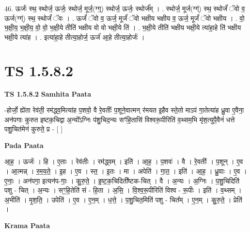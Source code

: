\documentclass[17pt]{extarticle}
\begin{document}
46. ऊर्जः॑ स्थ॒ स्थोर्ज॒ ऊर्जः॒ स्थोर्ज॒ मूर्ज॒(ग्ग्॒) स्थोर्ज॒ ऊर्जः॒ स्थोर्ज᳚म् । . स्थोर्ज॒ मूर्ज(ग्ग्॑) स्थ॒ स्थोर्जं॑ ॅवो व॒ ऊर्ज(ग्ग्॑) स्थ॒ स्थोर्जं॑ ॅवः । . ऊर्जं॑ ॅवो व॒ ऊर्ज॒ मूर्जं॑ ॅवो भक्षीय भक्षीय व॒ ऊर्ज॒ मूर्जं॑ ॅवो भक्षीय । . वो॒ भ॒क्षी॒य॒ भ॒क्षी॒य॒ वो॒ वो॒ भ॒क्षी॒ये तीति॑ भक्षीय वो वो भक्षी॒ये ति॑ । . भ॒क्षी॒ये तीति॑ भक्षीय भक्षी॒ये त्या॑हा॒हे ति॑ भक्षीय भक्षी॒ये त्या॑ह । . इत्या॑हा॒हे तीत्या॒होर्ज॒ ऊर्ज॑ आ॒हे तीत्या॒होर्जः॑ । \newline
\pagebreak
{}
\section*{ TS 1.5.8.2 }

\textbf{TS 1.5.8.2 } \newline
\textbf{Samhita Paata} \newline

-होर्जो॒ ह्ये॑ता रेव॑ती॒ रम॑द्ध्व॒मित्या॑ह प॒शवो॒ वै रे॒वतीः᳚ प॒शूने॒वात्मन् र॑मयत इ॒हैव स्ते॒तो माऽप॑ गा॒तेत्या॑ह ध्रु॒वा ए॒वैना॒ अन॑पगाः कुरुत इष्टक॒चिद्वा अ॒न्यो᳚ऽग्निः प॑शु॒चिद॒न्यः सꣳ॑हि॒तासि॑ विश्वरू॒पीरिति॑ व॒थ्सम॒भि मृ॑श॒त्युपै॒वैनं॑ धत्ते पशु॒चित॑मेनं कुरुते॒ प्र - [ ] \newline

\textbf{Pada Paata} \newline

आ॒ह॒ । ऊर्जः॑ । हि । ए॒ताः । रेव॑तीः । रम॑द्ध्वम् । इति॑ । आ॒ह॒ । प॒शवः॑ । वै । रे॒वतीः᳚ । प॒शून् । ए॒व । आ॒त्मन्न् । र॒म॒य॒ते॒ । इ॒ह । ए॒व । स्त॒ । इ॒तः । मा । अपेति॑ । गा॒त॒ । इति॑ । आ॒ह॒ । ध्रु॒वाः । ए॒व । ए॒नाः॒ । अन॑पगा॒ इत्यन॑प-गाः॒ । कु॒रु॒ते॒ । इ॒ष्ट॒क॒चिदिती᳚ष्टक-चित् । वै । अ॒न्यः । अ॒ग्निः । प॒शु॒चिदिति॑ पशु - चित् । अ॒न्यः । सꣳ॒॒हि॒तेति॑ सं - हि॒ता । अ॒सि॒ । वि॒श्व॒रू॒पीरिति॑ विश्व - रू॒पीः । इति॑ । व॒थ्सम् । अ॒भीति॑ । मृ॒श॒ति॒ । उपेति॑ । ए॒व । ए॒न॒म् । ध॒त्ते॒ । प॒शु॒चित॒मिति॑ पशु - चित᳚म् । ए॒न॒म् । कु॒रु॒ते॒ । प्रेति॑ ।  \newline


\textbf{Krama Paata} \newline
\end{document}
